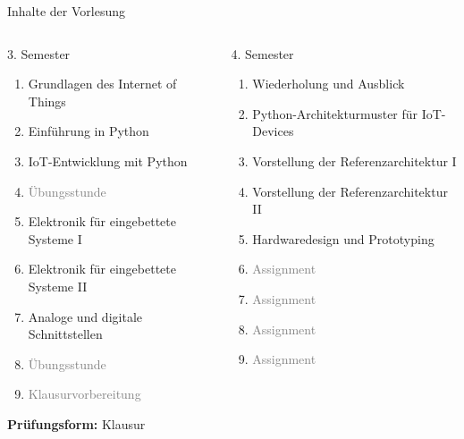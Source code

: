 {
\footnotesize
\begin{frame}{Inhalte der Vorlesung}
        \begin{columns}
            \begin{column}[T]{.5\textwidth}
                \begin{block}{3. Semester}
                    \medskip

                    \begin{enumerate}
                        \item Grundlagen des Internet of Things
                        \item Einführung in Python
                        \item IoT-Entwicklung mit Python
                        \item \textcolor{gray}{Übungsstunde}
                        \item Elektronik für eingebettete Systeme I
                        \item Elektronik für eingebettete Systeme II
                        \item Analoge und digitale Schnittstellen
                        \item \textcolor{gray}{Übungsstunde}
                        \item \textcolor{gray}{Klausurvorbereitung}
                    \end{enumerate}

                    \medskip
                    \textbf{Prüfungsform:} Klausur
                \end{block}
            \end{column}
            \begin{column}[T]{.5\textwidth}
                \begin{block}{4. Semester}
                    \medskip

                    \begin{enumerate}
                        \item Wiederholung und Ausblick
                        \item Python-Architekturmuster für IoT-Devices
                        \item Vorstellung der Referenzarchitektur I
                        \item Vorstellung der Referenzarchitektur II
                        \item Hardwaredesign und Prototyping
                        \item \textcolor{gray}{Assignment}
                        \item \textcolor{gray}{Assignment}
                        \item \textcolor{gray}{Assignment}
                        \item \textcolor{gray}{Assignment}
                    \end{enumerate}


\end{block}
\end{column}
\end{columns}
\end{frame}}

